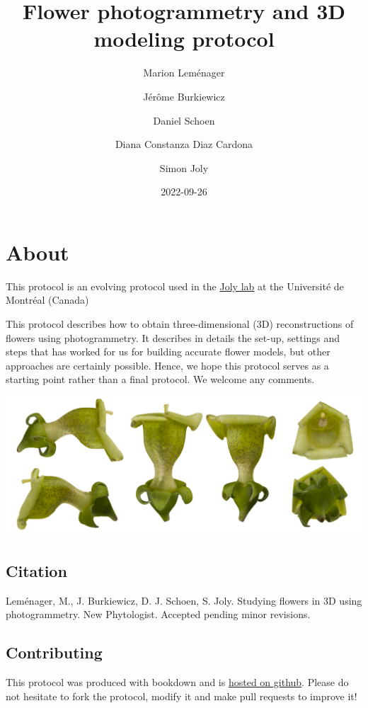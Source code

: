 \documentclass[
]{book}
\title{Flower photogrammetry and 3D modeling protocol}
\author{Marion Leménager \and Jérôme Burkiewicz \and Daniel Schoen \and Diana Constanza Diaz Cardona \and Simon Joly}
\date{2022-09-26}
\begin{document}
\maketitle

{
\setcounter{tocdepth}{1}
\tableofcontents
}
\hypertarget{about}{%
\chapter{About}\label{about}}

This protocol is an evolving protocol used in the \href{www.plantevolution.org}{Joly lab} at the Université de Montréal (Canada)

This protocol describes how to obtain three-dimensional (3D) reconstructions of flowers using photogrammetry. It describes in details the set-up, settings and steps that has worked for us for building accurate flower models, but other approaches are certainly possible. Hence, we hope this protocol serves as a starting point rather than a final protocol. We welcome any comments.

\includegraphics[width=1\textwidth,height=\textheight]{Figures/cover.jpg}

\hypertarget{citation}{%
\section{Citation}\label{citation}}

Leménager, M., J. Burkiewicz, D. J. Schoen, S. Joly. Studying flowers in 3D using photogrammetry. New Phytologist. Accepted pending minor revisions.

\hypertarget{contributing}{%
\section{Contributing}\label{contributing}}

This protocol was produced with bookdown and is \href{https://github.com/plantevolution/photogrammetry-protocol}{hosted on github}. Please do not hesitate to fork the protocol, modify it and make pull requests to improve it!
\end{document}
